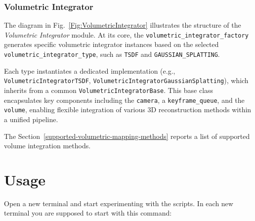 \documentclass{article}
\newenvironment{Shaded}{\begin{snugshade}}{\end{snugshade}}
\newcommand{\BuiltInTok}[1]{\textcolor[rgb]{0.74,0.68,0.62}{#1}}
\newcommand{\CommentTok}[1]{\textcolor[rgb]{0.00,0.40,1.00}{\textbf{\textit{#1}}}}
\newcommand{\ExtensionTok}[1]{\textcolor[rgb]{0.74,0.68,0.62}{#1}}
\newcommand{\NormalTok}[1]{\textcolor[rgb]{0.74,0.68,0.62}{#1}}
\begin{document}
\subsubsection{Volumetric Integrator}

The diagram in Fig.~\ref{Fig:VolumetricIntegrator} illustrates the structure of the \textit{Volumetric Integrator} module. At its core, the \texttt{volumetric\_integrator\_factory} generates specific volumetric integrator instances based on the selected \texttt{volumetric\_integrator\_type}, such as \texttt{TSDF} and \texttt{GAUSSIAN\_SPLATTING}.

Each type instantiates a dedicated implementation (e.g., \texttt{VolumetricIntegratorTSDF}, \texttt{VolumetricIntegrator\-Gaussian\-Splatting}), which inherits from a common \texttt{VolumetricIntegratorBase}. This base class encapsulates key components including the \texttt{camera}, a \texttt{keyframe\_queue}, and the \texttt{volume}, enabling flexible integration of various 3D reconstruction methods within a unified pipeline.

The Section~\ref{supported-volumetric-mapping-methods} reports a list of supported volume integration methods.


%

\FloatBarrier

\hypertarget{usage}{%
\section{Usage}\label{usage}}

Open a new terminal and start experimenting with the scripts. In each
new terminal you are supposed to start with this command:

\begin{scriptsize}
\begin{Shaded}
\end{Shaded}
\end{scriptsize}
\end{document}
